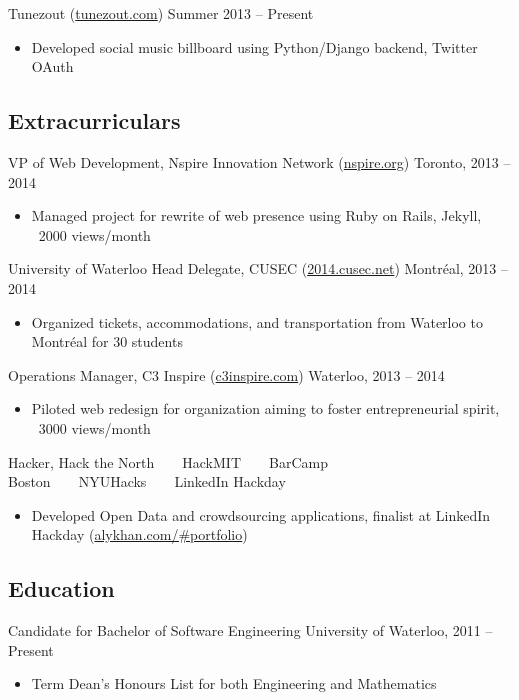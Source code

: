 \documentclass[letterpaper]{article}
\begin{document}
\noindent
Tunezout (\href{http://tunezout.com}{tunezout.com}) \hfill {\color{gray} Summer 2013 -- Present}

\begin{itemize}[leftmargin=1pc]
\itemsep0em
\item Developed social music billboard using Python/Django backend, Twitter OAuth
\end{itemize}

\subsection*{Extracurriculars}

\noindent
VP of Web Development, Nspire Innovation Network (\href{http://nspire.org}{nspire.org}) \hfill {\color{gray} Toronto, 2013 -- 2014}

\begin{itemize}[leftmargin=1pc]
\itemsep0em
\item Managed project for rewrite of web presence using Ruby on Rails, Jekyll, ~2000 views/month
\end{itemize}

\noindent
University of Waterloo Head Delegate, CUSEC (\href{http://2014.cusec.net}{2014.cusec.net}) \hfill {\color{gray} Montr\'{e}al, 2013 -- 2014}

\begin{itemize}[leftmargin=1pc]
\itemsep0em
\item Organized tickets, accommodations, and transportation from Waterloo to Montr\'{e}al for 30 students
\end{itemize}

\noindent
Operations Manager, C3 Inspire (\href{http://c3inspire.com}{c3inspire.com}) \hfill {\color{gray} Waterloo, 2013 -- 2014}

\begin{itemize}[leftmargin=1pc]
\itemsep0em
\item Piloted web redesign for organization aiming to foster entrepreneurial spirit, ~3000 views/month
\end{itemize}

\noindent
Hacker, Hack the North\ \ \textbullet\ \ HackMIT\ \ \textbullet\ \ BarCamp Boston\ \ \textbullet\ \ NYUHacks\ \ \textbullet\ \ LinkedIn Hackday

\begin{itemize}[leftmargin=1pc]
\itemsep0em
\item Developed Open Data and crowdsourcing applications, finalist at LinkedIn Hackday (\href{http://alykhan.com/\#portfolio}{alykhan.com/\#portfolio})
\end{itemize}

\subsection*{Education}

\noindent
Candidate for Bachelor of Software Engineering \hfill {\color{gray} University of Waterloo, 2011 -- Present}

\begin{itemize}[leftmargin=1pc]
\itemsep0em
\item Term Dean's Honours List for both Engineering and Mathematics
\end{itemize}
\end{document}
